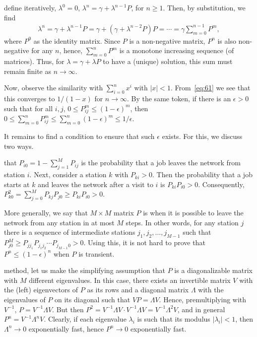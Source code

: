  define iteratively, $\lambda^0 = 0$, $\lambda^n = \gamma + \lambda^{n-1}P$, for $n\geq 1$.
Then, by substitution, we find
\begin{align*}
  \lambda^n = \gamma + \lambda^{n-1} P = \gamma + (\gamma + \lambda^{n-2}P) P = \cdots = \gamma \sum_{m=0}^{n-1} P^m,
\end{align*}
where $P^0$ as the identity matrix.
Since $P$ is a non-negative matrix, $P^n$ is also non-negative for any $n$, hence, $\sum_{m=0}^n P^m$ is a monotone increasing sequence (of matrices).
Thus, for $\lambda=\gamma + \lambda P$ to have a (unique) solution, this sum must remain finite as $n\to \infty$.

Now, observe the similarity with $\sum_{i=0}^n x^i$ with $|x| < 1$.
From~\cref{eq:61} we see that this converges to $1/(1-x)$ for $n\to \infty$.
By the same token, if there is an $\epsilon>0$ such that for all $i, j$, $0\leq P^m_{ij} \leq (1-\epsilon)^m$, then $0\leq \sum_{m=0}^n P_{ij}^m \leq \sum_{m=0}^n (1-\epsilon)^m \leq 1/\epsilon$.

It remains to find a condition to ensure that such $\epsilon$ exists.  For this, we discuss two ways.

 that $P_{i0} = 1-\sum_{j=1}^M P_{ij}$ is the probability that a job leaves the network from station $i$.
Next, consider a station $k$ with $P_{ki} > 0$.
Then the probability that a job starts at $k$ and leaves the network after a visit to $i$ is  $P_{ki}P_{i0}>0$.
Consequently, $P^2_{k0} = \sum_{j=0}^M P_{kj}P_{j0} \geq P_{ki}P_{i0} > 0$.


More generally, we say that $M\times M$ matrix $P$ is  when it is possible to leave the network from any station in at most $M$ steps.
In other words, for any station $j$ there is a sequence of intermediate stations $j_1, j_2, \ldots , j_{M-1}$ such that $P^{M}_{j0} \geq P_{j j_1}P_{j_1 j_2}\cdots P_{j_{M-1}0} > 0$.
Using this, it is not hard to prove that $P^n \leq  (1-\epsilon)^n$ when $P$ is transient.

 method, let us make the simplifying assumption that $P$ is a diagonalizable matrix with $M$ different eigenvalues.
In this case, there exists an invertible matrix $V$ with the (left) eigenvectors of $P$ as its rows and a diagonal matrix $\Lambda$ with the eigenvalues of $P$ on its diagonal such that $ V P = \Lambda V$.
Hence, premultiplying with $V^{-1}$, $ P = V^{-1}\Lambda V$.
But then $P^2 = V^{-1}\Lambda V \cdot V^{-1}\Lambda V= V^{-1}\Lambda^2 V$, and in general $P^n = V^{-1}\Lambda^n V$.
Clearly, if each eigenvalue $\lambda_i$ is such that its modulus $|\lambda_i| < 1$, then $\Lambda^n \to 0$ exponentially fast, hence $P^n\to 0$ exponentially fast.

